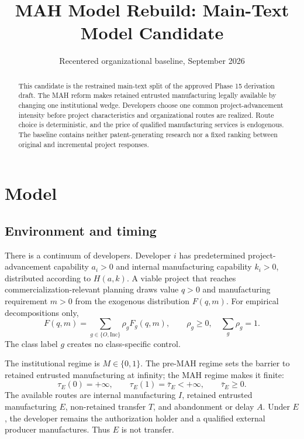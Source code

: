 \documentclass[11pt]{article}
\title{MAH Model Rebuild: Main-Text Model Candidate}
\author{}
\date{Recentered organizational baseline, September 2026}
\begin{document}
\maketitle

\begin{abstract}
This candidate is the restrained main-text split of the approved Phase 15
derivation draft. The MAH reform makes retained entrusted manufacturing
legally available by changing one institutional wedge. Developers choose one
common project-advancement intensity before project characteristics and
organizational routes are realized. Route choice is deterministic, and the
price of qualified manufacturing services is endogenous. The baseline
contains neither patent-generating research nor a fixed ranking between
original and incremental project responses.
\end{abstract}

\setcounter{section}{2}
\section{Model}
\label{sec:p16m-model}

\subsection{Environment and timing}
\label{subsec:p16m-environment}

There is a continuum of developers. Developer \(i\) has predetermined
project-advancement capability \(a_i>0\) and internal manufacturing capability
\(k_i>0\), distributed according to \(H(a,k)\). A viable project that reaches
commercialization-relevant planning draws value \(q>0\) and manufacturing
requirement \(m>0\) from the exogenous distribution \(F(q,m)\). For empirical
decompositions only,
\[
  F(q,m)=\sum_{g\in\{O,\mathrm{Inc}\}}\rho_gF_g(q,m),
  \qquad
  \rho_g\geq0,\quad \sum_g\rho_g=1.
\]
The class label \(g\) creates no class-specific control.

The institutional regime is \(M\in\{0,1\}\). The pre-MAH regime sets the
barrier to retained entrusted manufacturing at infinity; the MAH regime
makes it finite:
\begin{equation}
  \tau_E(0)=+\infty,
  \qquad
  \tau_E(1)=\bar\tau_E<+\infty,
  \qquad \bar\tau_E\geq0.
  \label{eq:p16m-policy}
\end{equation}
The available routes are internal manufacturing \(I\), retained entrusted
manufacturing \(E\), non-retained transfer \(T\), and abandonment or delay
\(A\). Under \(E\), the developer remains the authorization holder and a
qualified external producer manufactures. Thus \(E\) is not transfer.
\end{document}
